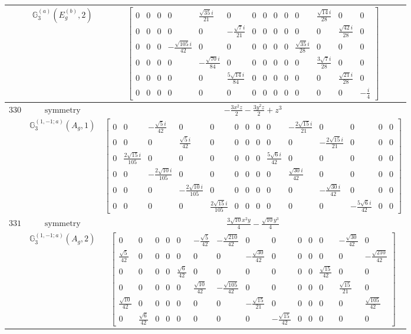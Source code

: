 \documentclass[fleqn,8pt,landscape]{jsarticle}
\begin{document}
\begin{longtable}{ccc}
$  $ & $ \mathbb{G}_{3}^{(a)}(E_{g}^{(b)},2) $ & $ \begin{bmatrix} 0 & 0 & 0 & 0 & \frac{\sqrt{35} i}{21} & 0 & 0 & 0 & 0 & 0 & 0 & \frac{\sqrt{14} i}{28} & 0 & 0 \\ 0 & 0 & 0 & 0 & 0 & - \frac{\sqrt{7} i}{21} & 0 & 0 & 0 & 0 & 0 & 0 & \frac{\sqrt{42} i}{28} & 0 \\ 0 & 0 & 0 & - \frac{\sqrt{105} i}{42} & 0 & 0 & 0 & 0 & 0 & 0 & \frac{\sqrt{35} i}{28} & 0 & 0 & 0 \\ 0 & 0 & 0 & 0 & - \frac{\sqrt{70} i}{84} & 0 & 0 & 0 & 0 & 0 & 0 & \frac{3 \sqrt{7} i}{28} & 0 & 0 \\ 0 & 0 & 0 & 0 & 0 & \frac{5 \sqrt{14} i}{84} & 0 & 0 & 0 & 0 & 0 & 0 & \frac{\sqrt{21} i}{28} & 0 \\ 0 & 0 & 0 & 0 & 0 & 0 & 0 & 0 & 0 & 0 & 0 & 0 & 0 & - \frac{i}{4} \end{bmatrix} $ \\ \hline
$ 330 $ & $ \text{symmetry} $ & $ - \frac{3 x^{2} z}{2} - \frac{3 y^{2} z}{2} + z^{3} $ \\
$  $ & $ \mathbb{G}_{3}^{(1,-1;a)}(A_{g},1) $ & $ \begin{bmatrix} 0 & 0 & - \frac{\sqrt{5} i}{42} & 0 & 0 & 0 & 0 & 0 & 0 & - \frac{2 \sqrt{15} i}{21} & 0 & 0 & 0 & 0 \\ 0 & 0 & 0 & \frac{\sqrt{5} i}{42} & 0 & 0 & 0 & 0 & 0 & 0 & - \frac{2 \sqrt{15} i}{21} & 0 & 0 & 0 \\ 0 & \frac{2 \sqrt{15} i}{105} & 0 & 0 & 0 & 0 & 0 & 0 & \frac{5 \sqrt{6} i}{42} & 0 & 0 & 0 & 0 & 0 \\ 0 & 0 & - \frac{2 \sqrt{10} i}{105} & 0 & 0 & 0 & 0 & 0 & 0 & \frac{\sqrt{30} i}{42} & 0 & 0 & 0 & 0 \\ 0 & 0 & 0 & - \frac{2 \sqrt{10} i}{105} & 0 & 0 & 0 & 0 & 0 & 0 & - \frac{\sqrt{30} i}{42} & 0 & 0 & 0 \\ 0 & 0 & 0 & 0 & \frac{2 \sqrt{15} i}{105} & 0 & 0 & 0 & 0 & 0 & 0 & - \frac{5 \sqrt{6} i}{42} & 0 & 0 \end{bmatrix} $ \\ \hline
$ 331 $ & $ \text{symmetry} $ & $ \frac{3 \sqrt{10} x^{2} y}{4} - \frac{\sqrt{10} y^{3}}{4} $ \\
$  $ & $ \mathbb{G}_{3}^{(1,-1;a)}(A_{g},2) $ & $ \begin{bmatrix} 0 & 0 & 0 & 0 & 0 & - \frac{\sqrt{5}}{42} & - \frac{\sqrt{210}}{42} & 0 & 0 & 0 & 0 & 0 & - \frac{\sqrt{30}}{42} & 0 \\ \frac{\sqrt{5}}{42} & 0 & 0 & 0 & 0 & 0 & 0 & - \frac{\sqrt{30}}{42} & 0 & 0 & 0 & 0 & 0 & - \frac{\sqrt{210}}{42} \\ 0 & 0 & 0 & 0 & \frac{\sqrt{6}}{42} & 0 & 0 & 0 & 0 & 0 & 0 & \frac{\sqrt{15}}{42} & 0 & 0 \\ 0 & 0 & 0 & 0 & 0 & \frac{\sqrt{10}}{42} & - \frac{\sqrt{105}}{42} & 0 & 0 & 0 & 0 & 0 & \frac{\sqrt{15}}{21} & 0 \\ \frac{\sqrt{10}}{42} & 0 & 0 & 0 & 0 & 0 & 0 & - \frac{\sqrt{15}}{21} & 0 & 0 & 0 & 0 & 0 & \frac{\sqrt{105}}{42} \\ 0 & \frac{\sqrt{6}}{42} & 0 & 0 & 0 & 0 & 0 & 0 & - \frac{\sqrt{15}}{42} & 0 & 0 & 0 & 0 & 0 \end{bmatrix} $ \\ \hline

\end{longtable}
\end{document}
